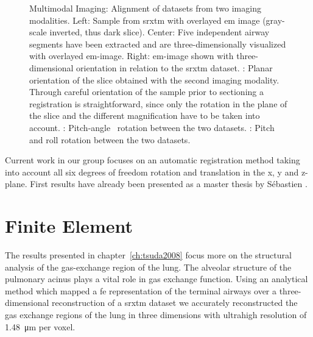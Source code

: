 \begin{figure}[h]
{%
		\label{subfig:correlation-arbitrary3}
		}%
	\caption[Multimodal Imaging]{Multimodal Imaging: Alignment of datasets from two imaging modalities. Left: Sample from \ac{srxtm} with overlayed \ac{em} image (gray-scale inverted, thus dark slice). Center: Five independent airway segments have been extracted and are three-dimensionally visualized with overlayed \ac{em}-image. Right: \ac{em}-image shown with three-dimensional orientation in relation to the \ac{srxtm} dataset. : Planar orientation of the slice obtained with the second imaging modality. Through careful orientation of the sample prior to sectioning a registration is straightforward, since only the rotation in the plane of the slice and the different magnification have to be taken into account. : Pitch-angle~\cite{YawPitchRoll} rotation between the two datasets. : Pitch and roll rotation between the two datasets.}
	\label{fig:correlation}
\end{figure}

Current work in our group focuses on an automatic registration method taking into account all six degrees of freedom \ie rotation and translation in the x, y and z-plane. First results have already been presented as a master thesis by Sébastien \citet{Barre2009}.

\section{Finite Element}
The results presented in chapter~\ref{ch:tsuda2008} focus more on the structural analysis of the gas-exchange region of the lung. The alveolar structure of the pulmonary acinus plays a vital role in gas exchange function. Using an analytical method which mapped a \ac{fe} representation of the terminal airways over a three-dimensional reconstruction of a \ac{srxtm} dataset we accurately reconstructed the gas exchange regions of the lung in three dimensions with ultrahigh resolution of \SI{1.48}{\micro\meter} per voxel.

